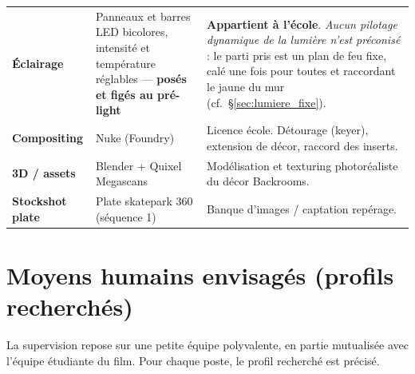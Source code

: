 \documentclass[11pt,a4paper]{report}
\begin{document}
\begin{center}
\begin{longtable}{>{\bfseries}p{3.5cm} p{4.3cm} >{\RaggedRight\arraybackslash}p{6.2cm}}
Éclairage & Panneaux et barres LED bicolores, intensité et température réglables --- \textbf{posés et figés au pré-light} & \textbf{Appartient à l'école}. \emph{Aucun pilotage dynamique de la lumière n'est préconisé} : le parti pris est un plan de feu fixe, calé une fois pour toutes et raccordant le jaune du mur (cf.~§\ref{sec:lumiere_fixe}). \\
Compositing & Nuke (Foundry) & Licence école. Détourage (keyer), extension de décor, raccord des inserts. \\
3D / assets & Blender + Quixel Megascans & Modélisation et texturing photoréaliste du décor Backrooms. \\
Stockshot plate & Plate skatepark 360\textdegree{} (séquence 1) & Banque d'images / captation repérage. \\
\end{longtable}
\end{center}

\section{Moyens humains envisagés (profils recherchés)}
La supervision repose sur une petite équipe polyvalente, en partie mutualisée avec l'équipe étudiante du film. Pour chaque poste, le profil recherché est précisé.
\end{document}
